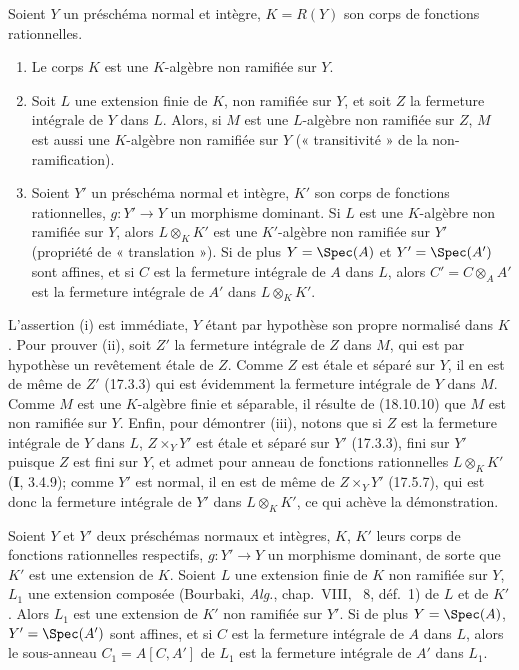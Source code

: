 \begin{proposition}[18.10.13]
\label{IV.18.10.13}
Soient $Y$ un préschéma normal et intègre, $K=R(Y)$ son corps de fonctions rationnelles.
\begin{enumerate}
  \item[\textup{(i)}] Le corps $K$ est une $K$-algèbre non ramifiée sur $Y$.
  \item[\textup{(ii)}] Soit $L$ une extension finie de $K$, non ramifiée sur $Y$, et soit $Z$ la fermeture intégrale de $Y$ dans $L$. Alors, si $M$ est une $L$-algèbre non ramifiée sur $Z$, $M$ est aussi une $K$-algèbre non ramifiée sur $Y$ \textup{(« transitivité » de la non-ramification)}.
  \item[\textup{(iii)}] Soient $Y'$ un préschéma normal et intègre, $K'$ son corps de fonctions rationnelles, $g:Y'\to Y$ un morphisme dominant. Si $L$ est une $K$-algèbre non ramifiée sur $Y$, alors $L\otimes_K K'$ est une $K'$-algèbre non ramifiée sur $Y'$ \textup{(propriété de « translation »)}. Si de plus $Y=\Spec(A)$ et $Y'=\Spec(A')$ sont affines, et si $C$ est la fermeture intégrale de $A$ dans $L$, alors $C'=C\otimes_A A'$ est la fermeture intégrale de $A'$ dans $L\otimes_K K'$.
\end{enumerate}
\end{proposition}

L'assertion (i) est immédiate, $Y$ étant par hypothèse son propre normalisé dans $K$. Pour prouver (ii), soit $Z'$ la fermeture intégrale de $Z$ dans $M$, qui est par hypothèse un revêtement étale de $Z$. Comme $Z$ est étale et séparé sur $Y$, il en est de même de $Z'$ (17.3.3) qui est évidemment la fermeture intégrale de $Y$ dans $M$. Comme $M$ est une $K$-algèbre finie et séparable, il résulte de (18.10.10) que $M$ est non ramifiée sur $Y$. Enfin, pour démontrer (iii), notons que si $Z$ est la fermeture intégrale de $Y$ dans $L$, $Z\times_Y Y'$ est étale et séparé sur $Y'$ (17.3.3), fini sur $Y'$ puisque $Z$ est fini sur $Y$, et admet pour anneau de fonctions rationnelles $L\otimes_K K'$ (\textbf{I}, 3.4.9); comme $Y'$ est normal, il en est de même de $Z\times_Y Y'$ (17.5.7), qui est donc la fermeture intégrale de $Y'$ dans $L\otimes_K K'$, ce qui achève la démonstration.

\begin{corollary}[18.10.14]
\label{IV.18.10.14}
Soient $Y$ et $Y'$ deux préschémas normaux et intègres, $K$, $K'$ leurs corps de fonctions rationnelles respectifs, $g:Y'\to Y$ un morphisme dominant, de sorte que $K'$ est une extension de $K$. Soient $L$ une extension finie de $K$ non ramifiée sur $Y$, $L_1$ une extension composée \textup{(Bourbaki, \emph{Alg.}, chap.~VIII, \textsection~8, déf.~1) de} $L$ et de $K'$. Alors $L_1$ est une extension de $K'$ non ramifiée sur $Y'$. Si de plus $Y=\Spec(A)$, $Y'=\Spec(A')$ sont affines, et si $C$ est la fermeture intégrale de $A$ dans $L$, alors le sous-anneau $C_1=A[C,A']$ de $L_1$ est la fermeture intégrale de $A'$ dans $L_1$.
\end{corollary}

